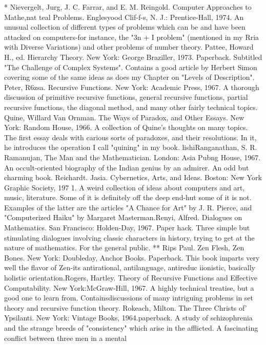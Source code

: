 * Nievergelt, Jurg, J. C. Farrar, and E. M. Reingold. Computer Approaches to Mathe,nat
  teal Problems. Englesyood Clif-f-s, N. J.: Prentice-Hall, 1974. An unusual collection of
  different types of problems which can be and have been attacked on computers-for
  instance, the "3n + I problem" (mentioned in my Rria with Diverse Variations) and
  other problems of number theory.
Pattee, Howard H., ed. Hierarchy Theory. New York: George Braziller, 1973. Paperback.
  Subtitled "The Challenge of Complex Systems". Contains a good article by Herbert
  Simon covering some of the same ideas as does my Chapter on "Levels of Description".
Peter, R6zsa. Recursive Functions. New York: Academic Press, 1967. A thorough
  discussion of primitive recursive functions, general recursive functions, partial
  recursive functions, the diagonal method, and many other fairly technical topics.
Quine, Willard Van Ornman. The Ways of Paradox, and Other Essays. New York:
  Random House, 1966. A collection of Quine's thoughts on many topics. The first essay
  deals with carious sorts of paradoxes, and their resolutions. In it, he introduces the
  operation I call "quining" in my book.
lishiRanganathan, S. R. Ramanujan, The Man and the Mathematician. London: Asia
  Pubng House, 1967. An occult-oriented biography of the Indian genius by an admirer.
  An odd but charming book.
Reichardt. Jasia. Cybernetics, Arts, and Ideas. Boston: New York Graphic Society,
197 1. A weird collection of ideas about computers and art, music, literature. Some of it
  is definitely off the deep end-hut some of it is not. Examples of the latter are the articles
  "A Chance for Art" by J. R. Pierce, and "Computerized Haiku" by Margaret
  Masterman.Renyi, Alfred. Dialogues on Mathematics. San Francisco: Holden-Day,
  1967. Paper hack. Three simple but stimulating dialogues involving classic characters
  in history, trying to get at the nature of mathematics. For the general public.
** Rips Paul. Zen Flesh, Zen Bones. New York: Doubleday, Anchor Books. Paperback.
  This book imparts very well the flavor of Zen-its antirational, antilanguage, antireduc
iionistic, basically holistic orientation.Rogers, Hartley. Theory of Recursive Functions
  and Effective Computability. New York:McGraw-Hill, 1967. A highly technical
  treatise, but a good one to learn from. Containsdiscussions of many intriguing problems
  in set theory and recursive function theory.
Rokeach, Milton. The Three Christs of' Ypsilanti. New York: Vintage Books,
  1964.paperback. A study of schizophrenia and the strange breeds of "consistency"
  which arise in the afflicted. A fascinating conflict between three men in a mental
